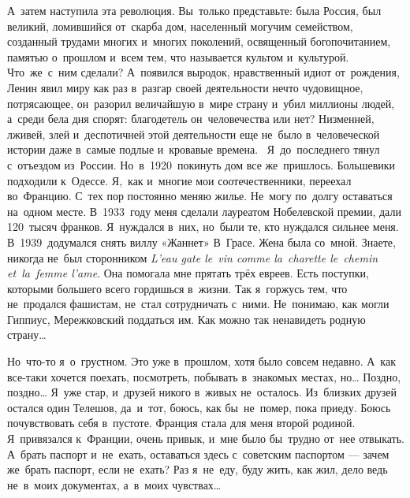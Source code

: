 А~затем наступила эта революция.
Вы~только представьте: была Россия, был великий, ломившийся от~скарба дом, населенный могучим семейством, созданный трудами многих и~многих поколений, освященный богопочитанием, памятью о~прошлом и~всем тем, что называется культом и~культурой.
Что~же~с~ним сделали? 
А~появился выродок, нравственный идиот от~рождения, Ленин явил миру как раз в~разгар своей деятельности нечто чудовищное, потрясающее, он~разорил величайшую в~мире страну и~убил миллионы людей, а~среди бела дня спорят: благодетель он~человечества или нет? 
Низменней, лживей, злей и~деспотичней этой деятельности еще не~было в~человеческой истории даже в~самые подлые и~кровавые времена.
~Я~до~последнего тянул с~отъездом из~России.
Но~в~1920~покинуть дом все же~пришлось.
Большевики подходили к~Одессе.
Я,~как и~многие мои соотечественники, переехал во~Францию.
С~тех пор постоянно меняю жилье.
Не~могу по~долгу оставаться на~одном месте.
В~1933~году меня сделали лауреатом Нобелевской премии, дали 120~тысяч франков.
Я~нуждался в~них, но~были те, кто нуждался сильнее меня.
В~1939~додумался снять виллу «Жаннет» В~Грасе.
Жена была со~мной.
Знаете, никогда не~был сторонником \textit{L'eau gate le~vin comme la~charette le~chemin et~la~femme l'ame}.
Она помогала мне прятать трёх евреев.
Есть поступки, которыми большего всего гордишься в~жизни.
Так я~горжусь тем, что не~продался фашистам, не~стал сотрудничать с~ними.
Не~понимаю, как могли Гиппиус, Мережковский поддаться им.
Как можно так ненавидеть родную страну…

Но~что-то я~о~грустном.
Это уже в~прошлом, хотя было совсем недавно.
А~как все-таки хочется поехать, посмотреть, побывать в~знакомых местах, но… 
Поздно, поздно… Я~уже стар, и~друзей никого в~живых не~осталось.
Из~близких друзей остался один Телешов, да~и~тот, боюсь, как бы~не~помер, пока приеду.
Боюсь почувствовать себя в~пустоте.
Франция стала для меня второй родиной.
Я~привязался к~Франции, очень привык, и~мне было бы~трудно от~нее отвыкать.
А~брать паспорт и~не~ехать, оставаться здесь с~советским паспортом --- зачем же~брать паспорт, если не~ехать?
Раз я~не~еду, буду жить, как жил, дело ведь не~в~моих документах, а~в~моих чувствах… 
